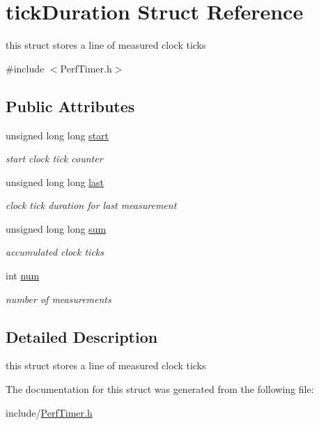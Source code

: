 \hypertarget{structtickDuration}{}\section{tick\+Duration Struct Reference}
\label{structtickDuration}


this struct stores a line of measured clock ticks  




{\ttfamily \#include $<$Perf\+Timer.\+h$>$}

\subsection*{Public Attributes}
\begin{DoxyCompactItemize}
\item 
\mbox{\label{structtickDuration_a312f5539e2214dab84d3d7442c1dad13}} 
unsigned long long \hyperlink{structtickDuration_a312f5539e2214dab84d3d7442c1dad13}{start}
\begin{DoxyCompactList}\small\item\em start clock tick counter \end{DoxyCompactList}\item 
\mbox{\label{structtickDuration_ae9dd0dbcd3f2eb9d58adb7980a34a51e}} 
unsigned long long \hyperlink{structtickDuration_ae9dd0dbcd3f2eb9d58adb7980a34a51e}{last}
\begin{DoxyCompactList}\small\item\em clock tick duration for last measurement \end{DoxyCompactList}\item 
\mbox{\label{structtickDuration_a5845a2fb2924f43ffa3cd40ced9c7ba8}} 
unsigned long long \hyperlink{structtickDuration_a5845a2fb2924f43ffa3cd40ced9c7ba8}{sum}
\begin{DoxyCompactList}\small\item\em accumulated clock ticks \end{DoxyCompactList}\item 
\mbox{\label{structtickDuration_a564886cc75fa9f7d2ddeb275025e0377}} 
int \hyperlink{structtickDuration_a564886cc75fa9f7d2ddeb275025e0377}{num}
\begin{DoxyCompactList}\small\item\em number of measurements \end{DoxyCompactList}\end{DoxyCompactItemize}


\subsection{Detailed Description}
this struct stores a line of measured clock ticks 

The documentation for this struct was generated from the following file\+:\begin{DoxyCompactItemize}
\item 
include/\hyperlink{PerfTimer_8h}{Perf\+Timer.\+h}\end{DoxyCompactItemize}
